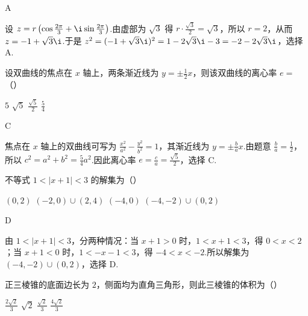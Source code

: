 \begin{answer}A\end{answer}

\begin{solution}
设 \(z=r\left(\cos\frac{2\pi}{3}+\i\sin\frac{2\pi}{3}\right)\).由虚部为 \(\sqrt{3}\) 得 \(r\cdot\frac{\sqrt{3}}{2}=\sqrt{3}\)，所以 \(r=2\)，从而 \(z=-1+\sqrt{3}\i\).于是 \(z^2=(-1+\sqrt{3}\i)^2=1-2\sqrt{3}\i-3=-2-2\sqrt{3}\i\)，选择 A.
\end{solution}

\begin{problem}
设双曲线的焦点在 \(x\) 轴上，两条渐近线为 \(y = \pm \frac{1}{2} x\)，则该双曲线的离心率 \(e =\)（\quad）

\choices
    {\(5\)}
    {\(\sqrt{5}\)}
    {\(\frac{\sqrt{5}}{2}\)}
    {\(\frac{5}{4}\)}
\end{problem}

\begin{answer}C\end{answer}

\begin{solution}
焦点在 \(x\) 轴上的双曲线可写为 \(\frac{x^2}{a^2}-\frac{y^2}{b^2}=1\)，其渐近线为 \(y=\pm\frac{b}{a}x\).由题意 \(\frac{b}{a}=\frac12\)，所以 \(c^2=a^2+b^2=\frac54a^2\).因此离心率 \(e=\frac{c}{a}=\frac{\sqrt{5}}{2}\)，选择 C.
\end{solution}

\begin{problem}
不等式 \(1 < |x + 1| < 3\) 的解集为（\quad）

\choices
    {\((0,2)\)}
    {\((-2,0) \cup (2,4)\)}
    {\((-4,0)\)}
    {\((-4,-2) \cup (0,2)\)}
\end{problem}

\begin{answer}D\end{answer}

\begin{solution}
由 \(1<\lvert x+1\rvert<3\)，分两种情况：当 \(x+1>0\) 时，\(1<x+1<3\)，得 \(0<x<2\)；当 \(x+1<0\) 时，\(1<-x-1<3\)，得 \(-4<x<-2\).所以解集为 \((-4,-2)\cup(0,2)\)，选择 D.
\end{solution}

\begin{problem}
正三棱锥的底面边长为 \(2\)，侧面均为直角三角形，则此三棱锥的体积为（\quad）

\choices
    {\(\frac{2\sqrt{2}}{3}\)}
    {\(\sqrt{2}\)}
    {\(\frac{\sqrt{2}}{3}\)}
    {\(\frac{4\sqrt{2}}{3}\)}
\end{problem}

